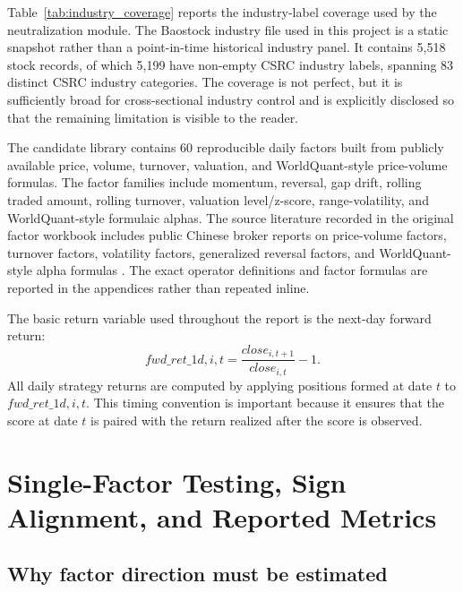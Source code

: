 \documentclass[11pt]{article}
\begin{document}
Table~\ref{tab:industry_coverage} reports the industry-label coverage used by the neutralization module. The Baostock industry file used in this project is a static snapshot rather than a point-in-time historical industry panel. It contains 5,518 stock records, of which 5,199 have non-empty CSRC industry labels, spanning 83 distinct CSRC industry categories. The coverage is not perfect, but it is sufficiently broad for cross-sectional industry control and is explicitly disclosed so that the remaining limitation is visible to the reader.

\begin{table}[H]
\centering
\caption{Industry coverage in the research panel}
\label{tab:industry_coverage}

\end{table}

The candidate library contains 60 reproducible daily factors built from publicly available price, volume, turnover, valuation, and WorldQuant-style price-volume formulas. The factor families include momentum, reversal, gap drift, rolling traded amount, rolling turnover, valuation level/z-score, range-volatility, and WorldQuant-style formulaic alphas. The source literature recorded in the original factor workbook includes public Chinese broker reports on price-volume factors, turnover factors, volatility factors, generalized reversal factors, and WorldQuant-style alpha formulas \citep{worldquant_101_alphas,haitong_two_sided_volatility_2017,gtja_short_cycle_price_volume_2017,pacific_generalized_reversal_2024,northeast_fund_leverage_2024,huatai_momentum_2016,huatai_turnover_2017,huatai_volatility_2017}. The exact operator definitions and factor formulas are reported in the appendices rather than repeated inline.

The basic return variable used throughout the report is the next-day forward return:
\[
fwd\_ret\_{1d,i,t} = \frac{close_{i,t+1}}{close_{i,t}} - 1.
\]
All daily strategy returns are computed by applying positions formed at date \(t\) to \(fwd\_ret\_{1d,i,t}\). This timing convention is important because it ensures that the score at date \(t\) is paired with the return realized after the score is observed.

\section{Single-Factor Testing, Sign Alignment, and Reported Metrics}

\subsection{Why factor direction must be estimated}
\end{document}
